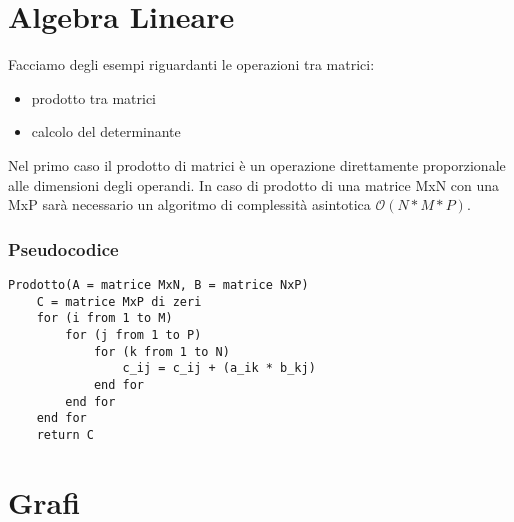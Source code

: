 \section{Algebra Lineare}
Facciamo degli esempi riguardanti le operazioni tra matrici:
\begin{itemize}
\item{prodotto tra matrici}
\item{calcolo del determinante}
\end{itemize}
Nel primo caso il prodotto di matrici è un operazione direttamente proporzionale alle dimensioni degli operandi. In caso di prodotto di una matrice MxN con una MxP sarà necessario un algoritmo di complessità asintotica  $\mathcal {O}(N*M*P)$.
\subsubsection{Pseudocodice}
\begin{verbatim}
Prodotto(A = matrice MxN, B = matrice NxP)
	C = matrice MxP di zeri
    for (i from 1 to M)
        for (j from 1 to P)
            for (k from 1 to N)
                c_ij = c_ij + (a_ik * b_kj)
            end for
        end for
    end for
    return C
\end{verbatim}

\section{Grafi}
